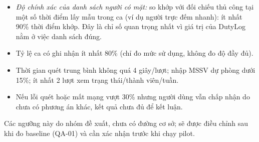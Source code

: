 \begin{itemize}
    \begin{itemize}[nosep]
        \item \emph{Độ chính xác của danh sách người có mặt:} so khớp với đối chiếu thủ công tại một số thời điểm lấy mẫu trong ca (ví dụ người trực đếm nhanh): ít nhất 90\% thời điểm khớp. Đây là chỉ số quan trọng nhất vì giá trị của DutyLog nằm ở việc danh sách đúng.
        \item Tỷ lệ ca có ghi nhận ít nhất 80\% (chỉ đo mức sử dụng, không đo độ đầy đủ).
        \item Thời gian quét trung bình không quá 4 giây/lượt; nhập MSSV dự phòng dưới 15\%; ít nhất 2 lượt xem trạng thái/thành viên/tuần.
        \item Nếu lỗi quét hoặc mất mạng vượt 30\% nhưng người dùng vẫn chấp nhận do chưa có phương án khác, kết quả chưa đủ để kết luận.
    \end{itemize}
    Các ngưỡng này do nhóm đề xuất, chưa có đường cơ sở; sẽ được điều chỉnh sau khi đo baseline (QA-01) và cần xác nhận trước khi chạy pilot.
\end{itemize}
